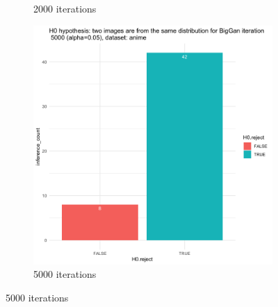 \documentclass{article}
\begin{document}
\begin{figure}[h!]
\begin{subfigure}[b]{0.3\textwidth}
         \caption{2000 iterations}
     \end{subfigure}
     \hfill
     \begin{subfigure}[b]{0.3\textwidth}
         \centering
         \includegraphics[width=\textwidth]{kmmd_figures/biggan_anime_5000.png}
         \caption{5000 iterations}
     \end{subfigure}
\end{figure}

\newpage
\end{document}
